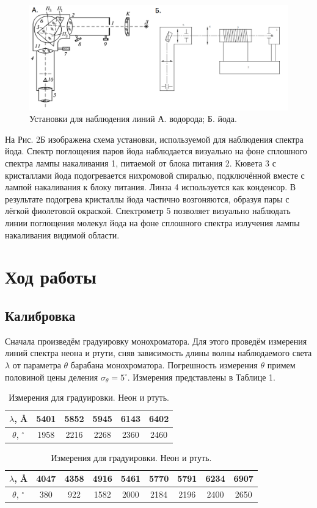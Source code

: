 \documentclass[a4paper,12pt]{article}
\theoremstyle{definition}
\begin{document}
	\begin{figure}[h]
	\includegraphics[scale=0.5]{2.png}
	\centering
	\caption{Установки для наблюдения линий А. водорода; Б. йода.}
	\end{figure} 

	На Рис. 2Б изображена схема установки, используемой для наблюдения спектра йода. Спектр поглощения паров йода наблюдается визуально на фоне сплошного спектра лампы накаливания 1, питаемой от блока питания 2. Кювета 3 с кристаллами йода подогревается нихромовой спиралью, подключённой вместе с лампой накаливания к блоку питания. Линза 4 используется как конденсор. В результате подогрева кристаллы йода частично возгоняются, образуя пары
	с лёгкой фиолетовой окраской. Спектрометр 5 позволяет визуально наблюдать линии поглощения молекул йода на фоне сплошного спектра излучения лампы накаливания видимой области.

	\section{Ход работы}
	\subsection*{Калибровка}
	Сначала произведём градуировку монохроматора. Для этого проведём измерения линий спектра неона и ртути, сняв зависимость длины волны наблюдаемого света $\lambda$ от параметра $\theta$ барабана монохроматора. Погрешность измерения $\theta$ примем половиной цены деления $\sigma_\theta = 5^\circ$. Измерения представлены в Таблице 1.
	\begin{table}[h]
		\centering
		\caption{Измерения для градуировки. Неон и ртуть.}
		\begin{tabular}{|c|c|c|c|c|c|} \hline
			$\lambda$, \AA	   & 5401 & 5852 & 5945 & 6143 & 6402 \\ \hline
			$\theta$, $^\circ$ & 1958 & 2216 & 2268 & 2360 & 2460 \\ \hline
		\end{tabular}
		
		\begin{tabular}{|c|c|c|c|c|c|c|c|c|} \hline
			$\lambda$, \AA      & 4047 & 4358 & 4916 & 5461 & 5770 & 5791 & 6234 & 6907 \\ \hline
			$\theta$, $^\circ$  &  380 &  922 & 1582 & 2000 & 2184 & 2196 & 2400 & 2650 \\ \hline
		\end{tabular}
	\end{table}
\end{document}
